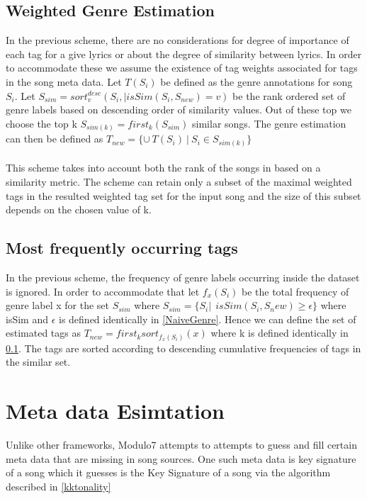 \subsection{Weighted Genre Estimation} \label{WeightedGenre}

\noindent In the previous scheme, there are no considerations for degree of importance of each tag for a give lyrics or about the degree of similarity between lyrics. In order to accommodate these we assume the existence of tag weights associated for tags in the song meta data. Let $T(S_i)$ be defined as the genre annotations for song $S_i$. Let $S_{sim} = sort_v^{desc}({S_i, | isSim(S_i, S_{new}) = v})$ be the rank ordered set of genre labels based on descending order of similarity values. Out of these top we choose the top k $S_{sim(k)} = first_{k} (S_{sim})$ similar songs. The genre estimation can then be defined as $T_{new} = \{\cup \ T(S_i) \ | \ S_i \in S_{sim(k)}\}$ \\\\
This scheme takes into account both the rank of the songs in based on a similarity metric. The scheme can retain only a subset of the maximal weighted tags in the resulted weighted tag set for the input song and the size of this subset depends on the chosen value of k. 

\subsection{Most frequently occurring tags} \label{MaxFrequencyGenre}

\noindent In the previous scheme, the frequency of genre labels occurring inside the dataset is ignored. In order to accommodate that let $f_x(S_i)$ be the total frequency of genre label x for the set $S_{sim}$ where $S_{sim} = \{S_i | \ \ isSim(S_i, S_new) \geq \epsilon\}$ where isSim and $\epsilon$ is defined identically in \ref{NaiveGenre}.  Hence we can define the set of estimated tags as $T_{new} = first_{k} sort_{f_x(S_i)}(x)$ where k is defined identically in \ref{WeightedGenre}. The tags are sorted according to descending cumulative frequencies of tags in the similar set. 

\section{Meta data Esimtation} \label{metadataestimation}

\noindent Unlike other frameworks, Modulo7 attempts to attempts to guess and fill certain meta data that are missing in song sources. One such meta data is key signature of a song which it guesses is the Key Signature of a song via the algorithm described in \ref{kktonality} 

